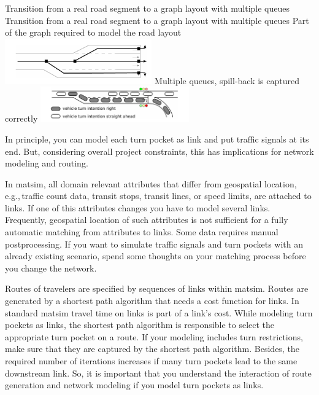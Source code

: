 \createfigure%
{Transition from a real road segment to a graph layout with multiple queues}%
{Transition from a real road segment to a graph layout with multiple queues}
{\label{fig:lanes_representation}}%
{%
  \createsubfigure%
	{Part of the graph required to model the road layout}
	{\includegraphics[width=0.475\textwidth]{extending/figures/signalslanes/link_lanes_layout}}
	{\label{fig:model_link_layout}}
  \createsubfigure%
	{Multiple queues, spill-back is captured correctly}%
	{\includegraphics[width=0.48\textwidth]{extending/figures/signalslanes/multiple_queue_model_inkscape.pdf}}%
	{\label{fig:lanes_representation_multiple_queue}}%
}%
{\citet{Grether2014PhD}}

In principle, you can model each turn pocket as link and put traffic signals at its end. 
But, considering overall project constraints, this has implications for network modeling and routing. 

In \gls{matsim}, all domain relevant attributes that differ from geospatial location, e.g.,\,traffic count data, transit stops, transit lines, or speed limits, are attached to links. 
If one of this attributes changes you have to model several links. 
Frequently, geospatial location of such attributes is not sufficient for a fully automatic matching from attributes to links. 
Some data requires manual postprocessing. 
If you want to simulate traffic signals and turn pockets with an already existing scenario, spend some thoughts on your matching process before you change the network.  

Routes of travelers are specified by sequences of links within \gls{matsim}. 
Routes are generated by a shortest path algorithm that needs a cost function for links. 
In standard \gls{matsim} travel time on links is part of a link's cost.
While modeling turn pockets as links, the shortest path algorithm is responsible to select the appropriate turn pocket on a route.
If your modeling includes turn restrictions, make sure that they are captured by the shortest path algorithm. 
Besides, the required number of iterations increases if many turn pockets lead to the same downstream link. 
So, it is important that you understand the interaction of route generation and network modeling if you model turn pockets as links. 

